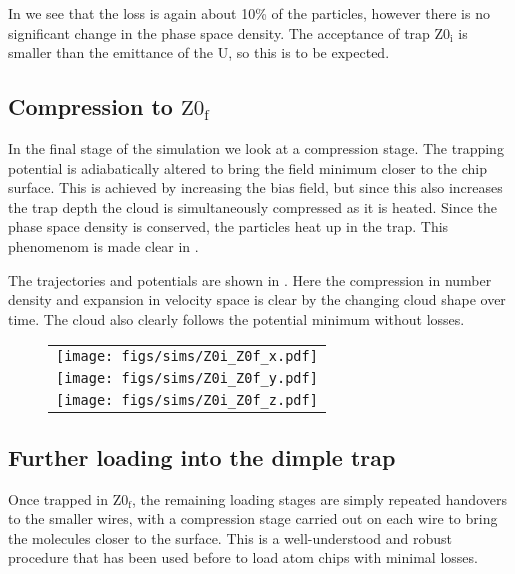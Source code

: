 In  we see that the loss is again about 10\% of
the particles, however there is no significant change in the phase space
density. The acceptance of trap $\mathrm{Z0_i}$ is smaller than the emittance
of the U, so this is to be expected.

\subsection{Compression to $\mathrm{Z0_f}$}


In the final stage of the simulation we look at a compression stage. The
trapping potential is adiabatically altered to bring the field minimum closer
to the chip surface. This is achieved by increasing the bias field, but since
this also increases the trap depth the cloud is simultaneously compressed as it
is heated. Since the phase space density is conserved, the particles heat up in
the trap. This phenomenom is made clear in .

The trajectories and potentials are shown in .
Here the compression in number density and expansion in velocity space is clear
by the changing cloud shape over time. The cloud also clearly follows the
potential minimum without losses.

\begin{figure}[p]
\centering
  \begin{tabular}{c}
    \texttt{[image: figs/sims/Z0i\_Z0f\_x.pdf]} \\
    \texttt{[image: figs/sims/Z0i\_Z0f\_y.pdf]} \\
    \texttt{[image: figs/sims/Z0i\_Z0f\_z.pdf]}
  \end{tabular}
  \caption{}
  \label{design:fig:Z0i_Z0f}
\end{figure}



\subsection{Further loading into the dimple trap}

Once trapped in $\mathrm{Z0_f}$, the remaining loading stages are simply
repeated handovers to the smaller wires, with a compression stage carried out
on each wire to bring the molecules closer to the surface. This is a
well-understood and robust procedure that has been used before to load atom
chips with minimal losses.~\cite{} 

